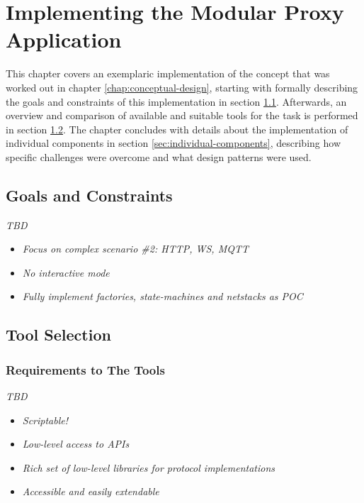 \chapter{Implementing the Modular Proxy Application}
\label{chap:implementation}
This chapter covers an exemplaric implementation of the concept that was worked out in chapter \ref{chap:conceptual-design}, starting with formally describing the goals and constraints of this implementation in section \ref{sec:goals-constraints}. Afterwards, an overview and comparison of available and suitable tools for the task is performed in section \ref{sec:tool-selection}. The chapter concludes with details about the implementation of individual components in section \ref{sec:individual-components}, describing how specific challenges were overcome and what design patterns were used.

\section{Goals and Constraints}
\label{sec:goals-constraints}
\emph{TBD} %
\begin{itemize}
    \item \emph{Focus on complex scenario \#2: HTTP, WS, MQTT}
    \item \emph{No interactive mode}
    \item \emph{Fully implement factories, state-machines and netstacks as POC}
\end{itemize}

\section{Tool Selection}
\label{sec:tool-selection}

\subsection{Requirements to The Tools}
\emph{TBD} %
\begin{itemize}
    \item \emph{Scriptable!}
    \item \emph{Low-level access to APIs}
    \item \emph{Rich set of low-level libraries for protocol implementations}
    \item \emph{Accessible and easily extendable}
\end{itemize}

